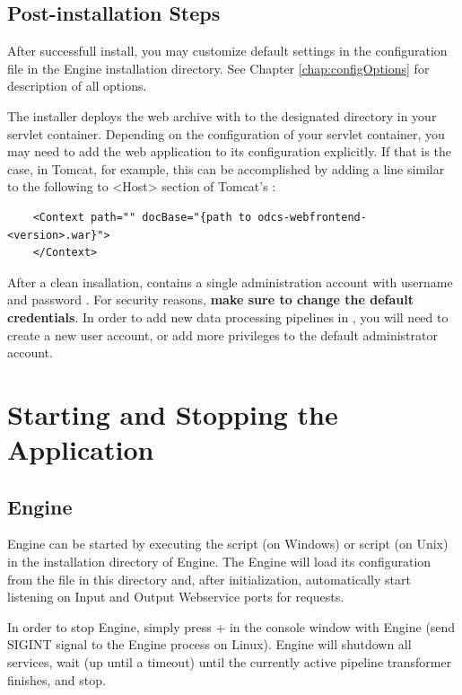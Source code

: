 \FloatBarrier


\section{Post-installation Steps}
After successfull install, you may customize default \odcs settings in the configuration file  in the Engine installation directory. See Chapter \ref{chap:configOptions} for description of all options.

The installer deploys the web archive with \FE to the designated directory in your servlet container. Depending on the configuration of your servlet container, you may need to add the \FE web application to its configuration explicitly. If that is the case, in Tomcat, for example, this can be accomplished by adding a line similar to the following to \textless{}Host\textgreater{} section of Tomcat's :  
\begin{verbatim} 
    <Context path="" docBase="{path to odcs-webfrontend-<version>.war}">
    </Context>
\end{verbatim} 

After a clean insallation, \FE contains a single administration account with username  and password . For security reasons, \textbf{make sure to change the default credentials}. In order to add new data processing pipelines in \FE, you will need to create a new user account, or add more privileges to the default administrator account.

\chapter{Starting and Stopping the Application}
\section{Engine}
\odcs Engine can be started by executing the  script (on Windows) or  script (on Unix) in the installation directory of \odcs Engine. The Engine will load its configuration from the  file in this directory and, after initialization, automatically start listening on Input and Output Webservice ports for requests.

In order to stop Engine, simply press + in the console window with Engine (send SIGINT signal to the Engine process on Linux). Engine will shutdown all services, wait (up until a timeout) until the currently active pipeline transformer finishes, and stop.

